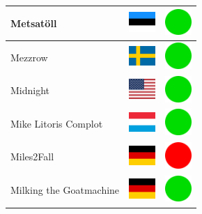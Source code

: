 \documentclass[12pt, a4paper, twoside]{report}
\begin{document}
\begin{center}
\begin{longtable}{|p{5cm}|p{2cm}|p{2cm}|}
 Metsatöll                                                  & \includegraphics[width=1cm]{../img/flags/ee} &   \includegraphics[width=1cm]{../likes/y} \\ \hline
 Mezzrow                                                    & \includegraphics[width=1cm]{../img/flags/se} &   \includegraphics[width=1cm]{../likes/y} \\ \hline
 Midnight                                                   & \includegraphics[width=1cm]{../img/flags/us} &   \includegraphics[width=1cm]{../likes/y} \\ \hline
 Mike Litoris Complot                                       & \includegraphics[width=1cm]{../img/flags/lu} &   \includegraphics[width=1cm]{../likes/y} \\ \hline
 Miles2Fall                                                 & \includegraphics[width=1cm]{../img/flags/de} &   \includegraphics[width=1cm]{../likes/n} \\ \hline
 Milking the Goatmachine                                    & \includegraphics[width=1cm]{../img/flags/de} &   \includegraphics[width=1cm]{../likes/y} \\ \hline

\end{longtable}
\end{center}
\end{document}
